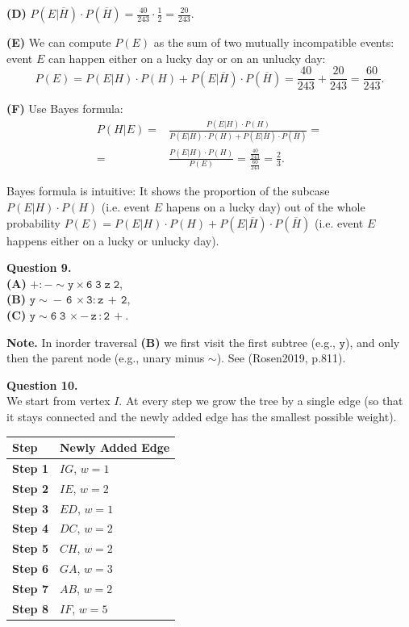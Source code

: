 \documentclass[jou]{apa6}
\begin{document}
{\bf (D)} $P(E|\overline{H}) \cdot P(\overline{H}) = \frac{40}{243}\cdot\frac{1}{2} = \frac{20}{243}$. 

{\bf (E)} We can compute $P(E)$ as the sum of two mutually incompatible events: 
event $E$ can happen either on a lucky day or on an unlucky day: 
$$P(E) = P(E|H)\cdot P(H) + P(E|\overline{H}) \cdot P(\overline{H}) = 
\frac{40}{243} + \frac{20}{243} = \frac{60}{243}.$$

{\bf (F)} Use Bayes formula: 
\begin{align}
P(H|E) = & \frac{P(E|H) \cdot P(H)}{P(E|H) \cdot P(H) + P(E|\overline{H}) \cdot P(\overline{H})} = \nonumber \\
 = & \frac{P(E|H) \cdot P(H)}{P(E)} =  \frac{ \frac{40}{243}}{ \frac{60}{243}} = \frac{2}{3}. \nonumber
\end{align}

Bayes formula is intuitive: It shows the proportion of the 
subcase $P(E|H) \cdot P(H)$ (i.e. event $E$ hapens on a lucky day) out of the
whole probability $P(E) = P(E|H)\cdot P(H) + P(E|\overline{H}) \cdot P(\overline{H})$
(i.e. event $E$ happens either on a lucky or unlucky day). 




\vspace{10pt}
{\bf Question 9.}\\
{\bf (A)} $\mathtt{+:-\sim{}y\times6\;3\;z\;2}$,\\
{\bf (B)} $\mathtt{y\sim{}-\,6\,\times3:z\,+\,2}$,\\
{\bf (C)} $\mathtt{y\sim{}6\;3\,\times-\,z\,:2\,+}$.

{\bf Note.} In inorder traversal {\bf (B)} we first visit 
the first subtree (e.g., $\mathtt{y}$), and only then the 
parent node (e.g., unary minus $\sim$). 
See (Rosen2019, p.811).



\newpage
{\bf Question 10.}\\

We start from vertex $I$. At every step we 
grow the tree by a single edge (so that it stays connected
and the newly added edge has the smallest possible weight). 


\begin{tabular}{|l|l|} \hline
{\bf Step} & {\bf Newly Added Edge} \\ \hline
{\bf Step 1} & $IG$, $w=1$ \\ \hline
{\bf Step 2} & $IE$, $w=2$ \\ \hline
{\bf Step 3} & $ED$, $w=1$ \\ \hline
{\bf Step 4} & $DC$, $w=2$ \\ \hline
{\bf Step 5} & $CH$, $w=2$ \\ \hline
{\bf Step 6} & $GA$, $w=3$ \\ \hline
{\bf Step 7} & $AB$, $w=2$ \\ \hline
{\bf Step 8} & $IF$, $w=5$ \\ \hline
\end{tabular}
\end{document}
